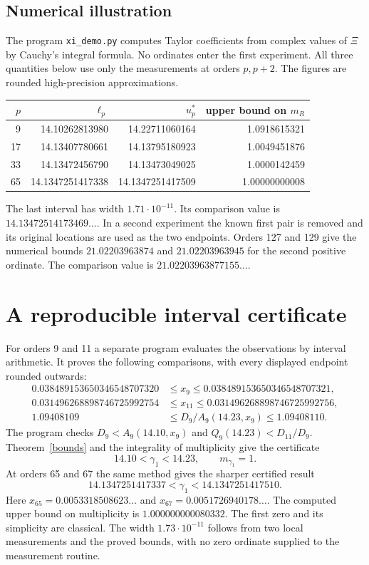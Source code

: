\documentclass[11pt,letterpaper]{article}
\numberwithin{equation}{section}
\begin{document}
\subsection*{Numerical illustration}
The program \texttt{xi\_demo.py} computes Taylor coefficients from complex
values of $\Xi$ by Cauchy's integral formula. No ordinates enter the
first experiment. All three quantities below use only the measurements
at orders $p,p+2$. The figures are rounded high-precision approximations.
\begin{center}\small
\begin{tabular}{rrrr}
\toprule
$p$ & $\ell_p$ & $u_p^*$ & upper bound on $m_R$\\ \midrule
 9 & 14.10262813980 & 14.22711060164 & 1.0918615321\\
17 & 14.13407780661 & 14.13795180923 & 1.0049451876\\
33 & 14.13472456790 & 14.13473049025 & 1.0000142459\\
65 & 14.1347251417338 & 14.1347251417509 & 1.00000000008\\
\bottomrule
\end{tabular}
\end{center}
The last interval has width $1.71\cdot10^{-11}$.
Its comparison value is $14.13472514173469\ldots$.
In a second experiment the known first pair is removed and its original
locations are used as the two endpoints. Orders 127 and 129 give the
numerical bounds $21.02203963874$ and $21.02203963945$ for the second
positive ordinate. The comparison value is $21.02203963877155\ldots$.
\newpage
\section{A reproducible interval certificate}
For orders 9 and 11 a separate program evaluates the observations by
interval arithmetic. It proves the following comparisons, with every
displayed endpoint rounded outwards:
\begin{align*}
0.038489153650346548707320 &\le x_9\le 0.038489153650346548707321,\\
0.031496268898746725992754 &\le x_{11}\le 0.031496268898746725992756,\\
1.09408109 &\le D_9/A_9(14.23,x_9)\le 1.09408110 .
\end{align*}
The program checks $D_9<A_9(14.10,x_9)$ and
$Q_9(14.23)<D_{11}/D_9$. Theorem~\ref{bounds} and the integrality of
multiplicity give the certificate
\[
          \boxed{14.10<\gamma_1<14.23,\qquad m_{\gamma_1}=1.}
\]
At orders 65 and 67 the same method gives the sharper certified result
\[
 \boxed{14.1347251417337<\gamma_1<14.1347251417510.}
\]
Here $x_{65}=0.0053318508623\ldots$ and $x_{67}=0.0051726940178\ldots$.
The computed upper bound on multiplicity is $1.000000000080332$.
The first zero and its simplicity are classical. The width
$1.73\cdot10^{-11}$ follows from two local measurements and the
proved bounds, with no zero ordinate supplied to the measurement routine.
\end{document}
